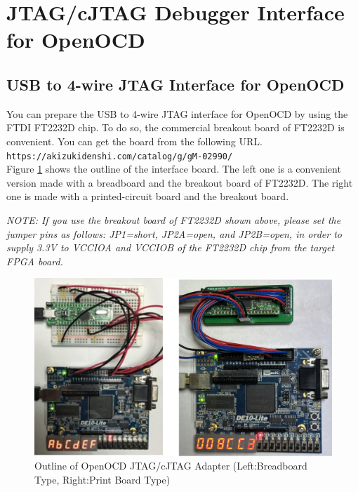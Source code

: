 \section{JTAG/cJTAG Debugger Interface for OpenOCD}
\label{sec:JTAGDEBUGGER}

\subsection{USB to 4-wire JTAG Interface for OpenOCD}

You can prepare the USB to 4-wire JTAG interface for OpenOCD by using the FTDI FT2232D chip. To do so, the commercial breakout board of FT2232D is convenient. You can get the board from the following URL.\\
\texttt{https://akizukidenshi.com/catalog/g/gM-02990/}\\

Figure \ref{fig:USBJTAGOUTLINE} shows the outline of the interface board. The left one is a convenient version made with a breadboard and the breakout board of FT2232D. The right one is made with a printed-circuit board and the breakout board.

\textit{NOTE: If you use the breakout board of FT2232D shown above, please set the jumper pins as follows: JP1=short, JP2A=open, and JP2B=open, in order to supply 3.3V to VCCIOA and VCCIOB of the FT2232D chip from the target FPGA board.}

\begin{figure}[H]
    \includegraphics[width=1.0\columnwidth]{./Figure/USB_JTAG_Outline.png}
    \caption{Outline of OpenOCD JTAG/cJTAG Adapter (Left:Breadboard Type, Right:Print Board Type)}
    \label{fig:USBJTAGOUTLINE}
\end{figure}


